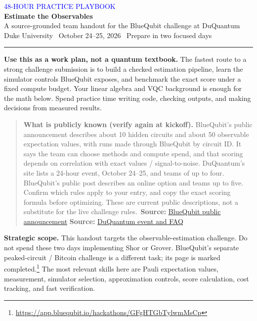 \documentclass[11pt,letterpaper]{article}
\newcommand{\source}[2]{\textbf{Source:} \href{#1}{#2}}
\begin{document}
\begin{center}
{\Large\textcolor{blue}{48-HOUR PRACTICE PLAYBOOK}}\\[4pt]
{\huge\bfseries\textcolor{ink}{Estimate the Observables}}\\[4pt]
{\large A source-grounded team handout for the BlueQubit challenge at DuQuantum}\\[8pt]
{\small Duke University \textbullet\ October 24--25, 2026 \textbullet\ Prepare in two focused days}
\end{center}
\vspace{4pt}\hrule\vspace{7pt}

\textbf{Use this as a work plan, not a quantum textbook.} The fastest route to a strong challenge submission is to build a checked estimation pipeline, learn the simulator controls BlueQubit exposes, and benchmark the exact score under a fixed compute budget. Your linear algebra and VQC background is enough for the math below. Spend practice time writing code, checking outputs, and making decisions from measured results.

\begin{quote}\small
\textbf{What is publicly known (verify again at kickoff).} BlueQubit's public announcement describes about 10 hidden circuits and about 50 observable expectation values, with runs made through BlueQubit by circuit ID. It says the team can choose methods and compute spend, and that scoring depends on correlation with exact values / signal-to-noise. DuQuantum's site lists a 24-hour event, October 24--25, and teams of up to four. BlueQubit's public post describes an online option and teams up to five. Confirm which rules apply to your entry, and copy the exact scoring formula before optimizing. These are current public descriptions, not a substitute for the live challenge rules.\
\source{https://qa.linkedin.com/company/bluequbit}{BlueQubit public announcement} \quad
\source{https://duquantum.org/}{DuQuantum event and FAQ}
\end{quote}

\textbf{Strategic scope.} This handout targets the observable-estimation challenge. Do not spend these two days implementing Shor or Grover. BlueQubit's separate peaked-circuit / Bitcoin challenge is a different task; its page is marked completed.\footnote{\url{https://app.bluequbit.io/hackathons/GFgHTGbTylwmMsCp}} The most relevant skills here are Pauli expectation values, measurement, simulator selection, approximation controls, score calculation, cost tracking, and fast verification.
\end{document}
